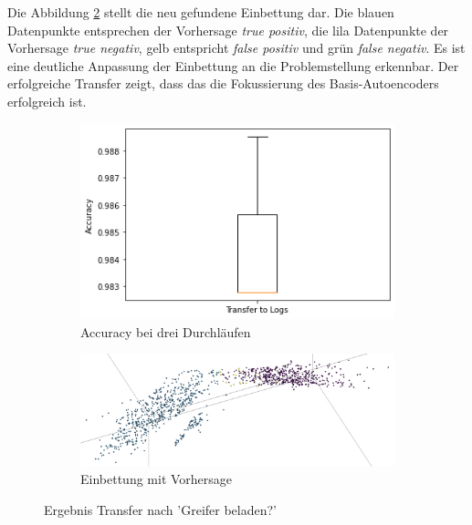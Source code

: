 	Die Abbildung \ref{img:Einbettung_Logs_Vorhersage} stellt die neu gefundene Einbettung dar. Die blauen Datenpunkte entsprechen der Vorhersage \textit{true positiv}, die lila Datenpunkte der Vorhersage \textit{true negativ}, gelb entspricht \textit{false positiv} und grün \textit{false negativ}. Es ist eine deutliche Anpassung der Einbettung an die Problemstellung erkennbar. Der erfolgreiche Transfer zeigt, dass das die Fokussierung des Basis-Autoencoders erfolgreich ist.     
	 \begin{figure}[h]
	\centering
	\begin{subfigure}[c]{0.49\textwidth}			
		\includegraphics[width=1\textwidth,center]{bilder/Hauptteil/Transfer_Logs/Acc_Transfer_Logs.png}
		\caption{Accuracy bei drei Durchläufen}
		\label{img:AccuracyTransferLogs}	
	\end{subfigure}
	\begin{subfigure}[c]{0.49\textwidth}			
		\includegraphics[width=1\textwidth, center]{bilder/Hauptteil/Transfer_Logs/Logs_transfer_emb.png}
		\caption{Einbettung mit Vorhersage}
		\label{img:Einbettung_Logs_Vorhersage}	
	\end{subfigure}
	\caption{Ergebnis Transfer nach 'Greifer beladen?'}
	\label{img:Ergebnis_Transfer}
\end{figure}


